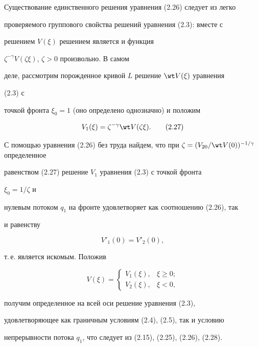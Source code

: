 Существование единственного решения уравнения (2.26) следует из легко 


проверяемого группового свойства решений уравнения (2.3): вместе с 


решением $V(\xi)$ решением является и функция 


$\zeta^{-\gamma}V(\zeta\xi)$, $\zeta>0$ произвольно. В самом 


деле, рассмотрим порожденное кривой $L$ решение $\wt V(\xi)$ уравнения 


(2.3) с 


точкой фронта $\xi_0=1$ (оно определено однозначно) и положим 


\begin{equation} 


V_1(\xi)=\zeta^{-\gamma} \wt V(\zeta\xi).\tag{2.27} 


\end{equation} 


С помощью уравнения (2.26) без труда найдем, что при $\zeta=(V_{20}/\wt 


V(0))^{-1/\gamma}$ определенное 


равенством (2.27) решение $V_1$ уравнения (2.3) с точкой фронта 


$\xi_0=1/\zeta$ и 


нулевым потоком $q_1$ на фронте удовлетворяет как соотношению (2.26), так 


и равенству 


\begin{equation} 


V'_1(0)=V'_2(0),\tag{2.28} 


\end{equation} 


т.\,е. является искомым. Положив 


$$ 


V(\xi)= 


\begin{cases} 


V_1(\xi), & \xi\ge0; \\ 


V_2(\xi), & \xi<0, 


\end{cases} 


$$ 


получим определенное на всей оси решение уравнения (2.3), 


удовлетворяющее как граничным условиям (2.4), (2.5), так и условию 


непрерывности потока $q_1$, что следует из (2.15), (2.25), (2.26), (2.28). 


